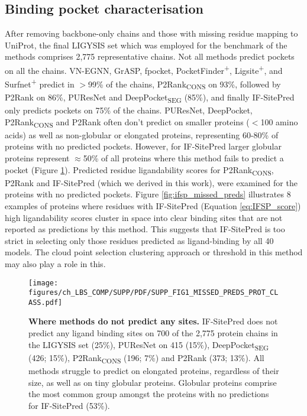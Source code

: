 \subsection{Binding pocket characterisation}

After removing backbone-only chains and those with missing residue mapping to UniProt, the final LIGYSIS set which was employed for the benchmark of the methods comprises 2,775 representative chains. Not all methods predict pockets on all the chains. VN-EGNN, GrASP, fpocket, PocketFinder\textsuperscript{+}, Ligsite\textsuperscript{+}, and Surfnet\textsuperscript{+} predict in $>$99\% of the chains, P2Rank\textsubscript{CONS} on 93\%, followed by P2Rank on 86\%, PUResNet and DeepPocket\textsubscript{SEG} (85\%), and finally IF-SitePred only predicts pockets on 75\% of the chains. PUResNet, DeepPocket, P2Rank\textsubscript{CONS} and P2Rank often don't predict on smaller proteins ($<$100 amino acids) as well as non-globular or elongated proteins, representing 60-80\% of proteins with no predicted pockets. However, for IF-SitePred larger globular proteins represent $\approx$50\% of all proteins where this method fails to predict a pocket (Figure \ref{fig:missed_preds_prot_class}). Predicted residue ligandability scores for P2Rank\textsubscript{CONS}, P2Rank and IF-SitePred (which we derived in this work), were examined for the proteins with no predicted pockets. Figure \ref{fig:ifsp_missed_preds} illustrates 8 examples of proteins where residues with IF-SitePred (Equation \ref{eq:IFSP_score}) high ligandability scores cluster in space into clear binding sites that are not reported as predictions by this method. This suggests that IF-SitePred is too strict in selecting only those residues predicted as ligand-binding by all 40 models. The cloud point selection clustering approach or threshold in this method may also play a role in this.

\begin{figure}[ht!]
    \centering
    \texttt{[image: figures/ch\_LBS\_COMP/SUPP/PDF/SUPP\_FIG1\_MISSED\_PREDS\_PROT\_CLASS.pdf]}
    \caption[Where methods do not predict any sites]{\textbf{Where methods do not predict any sites.} IF-SitePred does not predict any ligand binding sites on 700 of the 2,775 protein chains in the LIGYSIS set (25\%), PUResNet on 415 (15\%), DeepPocket\textsubscript{SEG} (426; 15\%), P2Rank\textsubscript{CONS} (196; 7\%) and P2Rank (373; 13\%). All methods struggle to predict on elongated proteins, regardless of their size, as well as on tiny globular proteins. Globular proteins comprise the most common group amongst the proteins with no predictions for IF-SitePred (53\%).}
    \label{fig:missed_preds_prot_class}
\end{figure}


